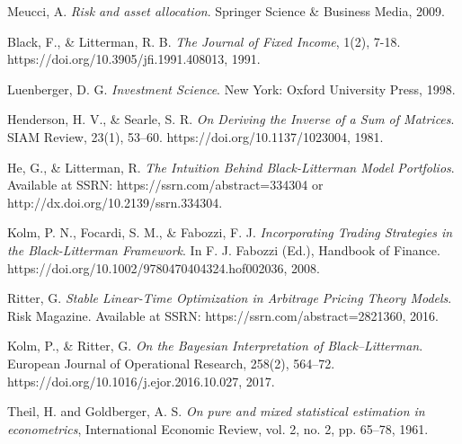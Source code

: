 \documentclass[13pt]{article}
\theoremstyle{definition}
\theoremstyle{remark}
\begin{document}
\newpage
\begin{thebibliography}{9}

Meucci, A. 
\textit{Risk and asset allocation}. 
Springer Science \& Business Media, 2009.

Black, F., \& Litterman, R. B. 
\textit{The Journal of Fixed Income}, 1(2), 7-18. 
https://doi.org/10.3905/jfi.1991.408013, 1991.

Luenberger, D. G. 
\textit{Investment Science}. 
New York: Oxford University Press, 1998.


Henderson, H. V., \& Searle, S. R. 
\textit{On Deriving the Inverse of a Sum of Matrices}. 
SIAM Review, 23(1), 53–60. 
https://doi.org/10.1137/1023004, 1981.

He, G., \& Litterman, R. 
\textit{The Intuition Behind Black-Litterman Model Portfolios}. 
Available at SSRN: https://ssrn.com/abstract=334304 or http://dx.doi.org/10.2139/ssrn.334304.

Kolm, P. N., Focardi, S. M., \& Fabozzi, F. J. 
\textit{Incorporating Trading Strategies in the Black-Litterman Framework}. 
In F. J. Fabozzi (Ed.), Handbook of Finance. 
https://doi.org/10.1002/9780470404324.hof002036, 2008.

Ritter, G. 
\textit{Stable Linear-Time Optimization in Arbitrage Pricing Theory Models}. 
Risk Magazine. Available at SSRN: https://ssrn.com/abstract=2821360, 2016.

Kolm, P., \& Ritter, G. 
\textit{On the Bayesian Interpretation of Black–Litterman}. 
European Journal of Operational Research, 258(2), 564–72. 
https://doi.org/10.1016/j.ejor.2016.10.027, 2017.

Theil, H. and Goldberger, A. S.
\textit{On pure and mixed statistical estimation in econometrics},
International Economic Review, vol. 2, no. 2, pp. 65--78, 1961.

\end{thebibliography}
\end{document}

